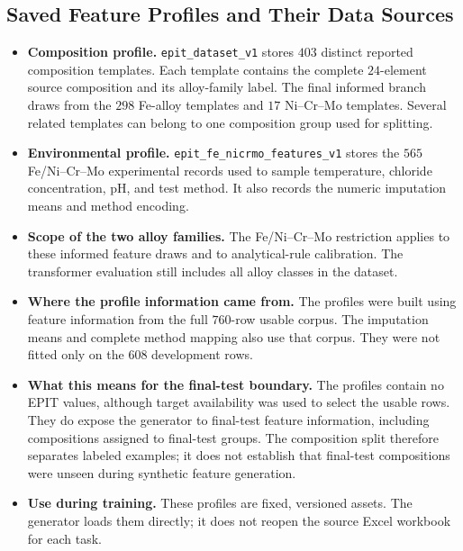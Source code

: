 \documentclass[11pt]{article}
\newenvironment{notes}
  {\begin{itemize}\setlength{\itemsep}{0.45em}\setlength{\parsep}{0pt}}
  {\end{itemize}}
\begin{document}
\subsection{Saved Feature Profiles and Their Data Sources}
\label{sec:feature-profile-provenance}

\begin{notes}
    \item \textbf{Composition profile.}
    \texttt{epit\_dataset\_v1} stores \(403\) distinct reported
    composition templates. Each template contains the complete
    \(24\)-element source composition and its alloy-family label.
    The final informed branch draws from the \(298\) Fe-alloy
    templates and \(17\) Ni--Cr--Mo templates. Several related
    templates can belong to one composition group used for splitting.

    \item \textbf{Environmental profile.}
    \texttt{epit\_fe\_nicrmo\_features\_v1} stores the
    \(565\) Fe/Ni--Cr--Mo experimental records used to sample
    temperature, chloride concentration, pH, and test method.
    It also records the numeric imputation means and method encoding.

    \item \textbf{Scope of the two alloy families.}
    The Fe/Ni--Cr--Mo restriction applies to these informed
    feature draws and to analytical-rule calibration. The
    transformer evaluation still includes all alloy classes
    in the dataset.

    \item \textbf{Where the profile information came from.}
    The profiles were built using feature information from the
    full \(760\)-row usable corpus. The imputation means and
    complete method mapping also use that corpus. They were
    not fitted only on the \(608\) development rows.

    \item \textbf{What this means for the final-test boundary.}
    The profiles contain no EPIT values, although target
    availability was used to select the usable rows. They do
    expose the generator to final-test feature information,
    including compositions assigned to final-test groups.
    The composition split therefore separates labeled examples;
    it does not establish that final-test compositions were
    unseen during synthetic feature generation.

    \item \textbf{Use during training.} These profiles are fixed,
    versioned assets. The generator loads them directly; it does
    not reopen the source Excel workbook for each task.
\end{notes}
\end{document}
